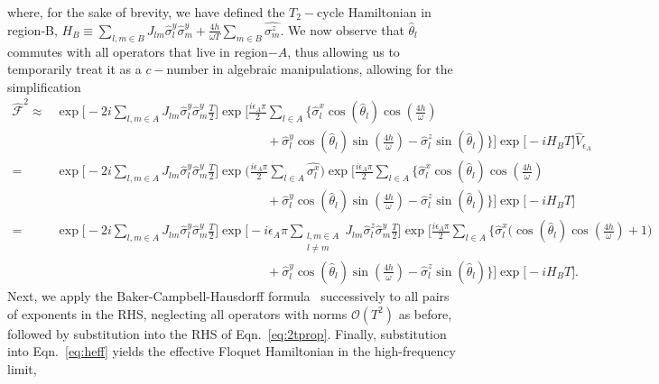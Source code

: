 \documentclass[
nofootinbib,
reprint,
superscriptaddress,
amsmath,amssymb,showkeys,
aps,
prb,
]{revtex4-2}
\begin{document}
	where, for the sake of brevity, we have defined the $T_2-$cycle Hamiltonian in region-B, $\displaystyle {H}_B \equiv \sum_{l,m\in B} J_{lm} \hat{\sigma}^y_l\hat{\sigma}^y_m + \frac{4h}{\omega T}\sum_{m \in B}\hat{\sigma^z_m}$. We now observe that $\hat{\theta}_l$ commutes with all operators that live in region$-A$, thus allowing us to temporarily treat it as a $c-$number in algebraic manipulations, allowing for the simplification
	\begin{align}		
		\hat{\mathcal{F}}^2 	\approx& \exp\Bigg[-2i  \sum_{l,m\in A}J_{lm} \hat{\sigma}^y_l\hat{\sigma}^y_m\frac{T}{2}\Bigg]\exp\Bigg[\frac{i \epsilon_A \pi}{2}\sum_{l\in A}\Big\{\hat{\sigma}^x_l \cos(\hat{\theta}_l)\cos(\frac{4h}{\omega})\nonumber\\
		&\hspace{7cm}+ \hat{\sigma}^y_l \cos(\hat{\theta}_l)\sin(\frac{4h}{\omega})-\hat{\sigma}^z_l \sin(\hat{\theta}_l)\Big\}\Bigg] \exp\big[-i H_B T\big]\hat{V}_{\epsilon_A}\nonumber\\
		=&\exp\Bigg[-2i \sum_{l,m\in A}J_{lm} \hat{\sigma}_l^y\hat{\sigma}_m^y\frac{T}{2}\Bigg] \exp\Big(\frac{i\epsilon_A \pi}{2}\sum_{l\in A}\hat{\sigma^x_l}\Big) \exp\Bigg[\frac{i \epsilon_A \pi}{2}\sum_{l\in A}\Big\{\hat{\sigma}^x_l \cos(\hat{\theta}_l)\cos(\frac{4h}{\omega})\nonumber\\
		&\hspace{ 7cm}  +\hat{\sigma}^y_l \cos(\hat{\theta}_l)\sin(\frac{4h}{\omega})-\hat{\sigma}^z_l \sin(\hat{\theta}_l)\Big\}\Bigg]\exp\big[-i H_B T\big]\nonumber\\
		=&\exp\Bigg[-2i\sum_{l,m\in A}J_{lm}\hat{\sigma}^y_l\hat{\sigma}^y_m \frac{T}{2}\Bigg] \exp\Bigg[-i\epsilon_A \pi \sum_{\substack{l,m \in A\\l\neq m}}J_{lm} \hat{\sigma}^z_l\hat{\sigma}^y_m\frac{T}{2}\Bigg] \exp\Bigg[\frac{i \epsilon_A \pi}{2}\sum_{l\in A}\Bigg\{\hat{\sigma}^x_l\Bigg( \cos(\hat{\theta}_l)\cos(\frac{4h}{\omega})+1\Bigg)\nonumber\\
		&\hspace{7cm} +\hat{\sigma}^y_l \cos(\hat{\theta}_l)\sin(\frac{4h}{\omega})-\hat{\sigma}^z_l \sin(\hat{\theta}_l)\Bigg\}\Bigg] \exp\big[-i H_B T\big].
	\end{align}
	Next, we apply the Baker-Campbell-Hausdorff formula~\cite{Magnus1954} successively to all pairs of exponents in the RHS, neglecting all operators with norms $\mathcal{O}(T^2)$ as before, followed by substitution into the RHS of Eqn.~\ref{eq:2tprop}. Finally, substitution into Eqn.~\ref{eq:heff} yields the effective Floquet Hamiltonian in the high-frequency limit, 
\end{document}

